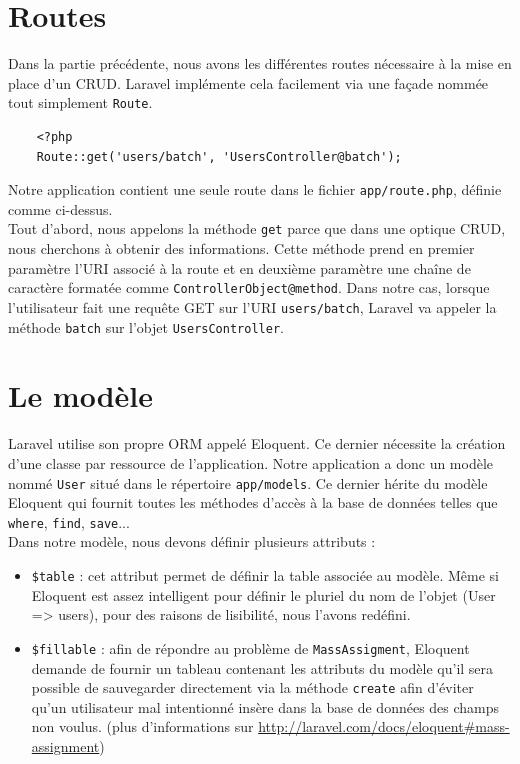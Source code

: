 \section{Routes}
	Dans la partie précédente, nous avons les différentes routes nécessaire à la mise en place d'un CRUD. Laravel implémente cela facilement via une façade nommée tout simplement \verb|Route|.

	\begin{verbatim}
	<?php
	Route::get('users/batch', 'UsersController@batch');
	\end{verbatim}
	Notre application contient une seule route dans le fichier \verb|app/route.php|, définie comme ci-dessus.\\

	Tout d'abord, nous appelons la méthode \verb|get| parce que dans une optique CRUD, nous cherchons à obtenir des informations. Cette méthode prend en premier paramètre l'URI associé à la route et en deuxième paramètre une chaîne de caractère  formatée comme \verb|ControllerObject@method|. Dans notre cas, lorsque l'utilisateur fait une requête GET sur l'URI \verb|users/batch|, Laravel va appeler la méthode \verb|batch| sur l'objet \verb|UsersController|.



\section{Le modèle}
	Laravel utilise son propre ORM appelé Eloquent. Ce dernier nécessite la création d'une classe par ressource de l'application. Notre application a donc un modèle nommé \verb|User| situé dans le répertoire \verb|app/models|. Ce dernier hérite du modèle Eloquent qui fournit toutes les méthodes d'accès à la base de données telles que \verb|where|, \verb|find|, \verb|save|...\\

	Dans notre modèle, nous devons définir plusieurs attributs :
	\begin{itemize}
		\item \verb|$table| : cet attribut permet de définir la table associée au modèle. Même si Eloquent est assez intelligent pour définir le pluriel du nom de l'objet (User => users), pour des raisons de lisibilité, nous l'avons redéfini.
		\item \verb|$fillable| : afin de répondre au problème de \verb|MassAssigment|, Eloquent demande de fournir un tableau contenant les attributs du modèle qu'il sera possible de sauvegarder directement via la méthode \verb|create| afin d'éviter qu'un utilisateur mal intentionné insère dans la base de données des champs non voulus. (plus d'informations sur \url{http://laravel.com/docs/eloquent#mass-assignment})
	\end{itemize}

